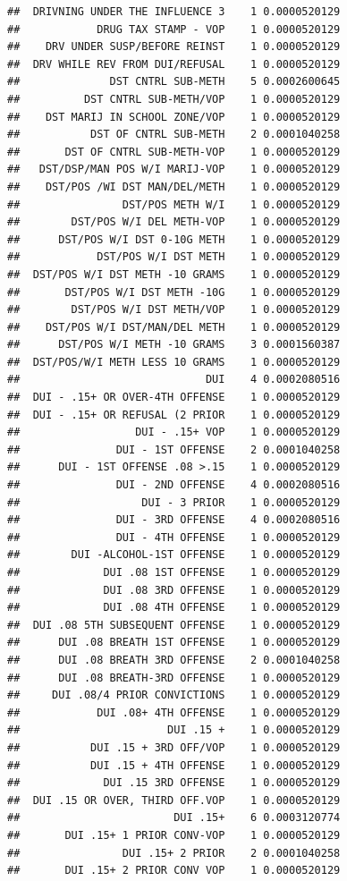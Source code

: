\documentclass[]{book}
\begin{document}
\begin{verbatim}
##  DRIVNING UNDER THE INFLUENCE 3    1 0.0000520129
##            DRUG TAX STAMP - VOP    1 0.0000520129
##    DRV UNDER SUSP/BEFORE REINST    1 0.0000520129
##  DRV WHILE REV FROM DUI/REFUSAL    1 0.0000520129
##              DST CNTRL SUB-METH    5 0.0002600645
##          DST CNTRL SUB-METH/VOP    1 0.0000520129
##    DST MARIJ IN SCHOOL ZONE/VOP    1 0.0000520129
##           DST OF CNTRL SUB-METH    2 0.0001040258
##       DST OF CNTRL SUB-METH-VOP    1 0.0000520129
##   DST/DSP/MAN POS W/I MARIJ-VOP    1 0.0000520129
##    DST/POS /WI DST MAN/DEL/METH    1 0.0000520129
##                DST/POS METH W/I    1 0.0000520129
##        DST/POS W/I DEL METH-VOP    1 0.0000520129
##      DST/POS W/I DST 0-10G METH    1 0.0000520129
##            DST/POS W/I DST METH    1 0.0000520129
##  DST/POS W/I DST METH -10 GRAMS    1 0.0000520129
##       DST/POS W/I DST METH -10G    1 0.0000520129
##        DST/POS W/I DST METH/VOP    1 0.0000520129
##    DST/POS W/I DST/MAN/DEL METH    1 0.0000520129
##      DST/POS W/I METH -10 GRAMS    3 0.0001560387
##  DST/POS/W/I METH LESS 10 GRAMS    1 0.0000520129
##                             DUI    4 0.0002080516
##  DUI - .15+ OR OVER-4TH OFFENSE    1 0.0000520129
##  DUI - .15+ OR REFUSAL (2 PRIOR    1 0.0000520129
##                  DUI - .15+ VOP    1 0.0000520129
##               DUI - 1ST OFFENSE    2 0.0001040258
##      DUI - 1ST OFFENSE .08 >.15    1 0.0000520129
##               DUI - 2ND OFFENSE    4 0.0002080516
##                   DUI - 3 PRIOR    1 0.0000520129
##               DUI - 3RD OFFENSE    4 0.0002080516
##               DUI - 4TH OFFENSE    1 0.0000520129
##        DUI -ALCOHOL-1ST OFFENSE    1 0.0000520129
##             DUI .08 1ST OFFENSE    1 0.0000520129
##             DUI .08 3RD OFFENSE    1 0.0000520129
##             DUI .08 4TH OFFENSE    1 0.0000520129
##  DUI .08 5TH SUBSEQUENT OFFENSE    1 0.0000520129
##      DUI .08 BREATH 1ST OFFENSE    1 0.0000520129
##      DUI .08 BREATH 3RD OFFENSE    2 0.0001040258
##      DUI .08 BREATH-3RD OFFENSE    1 0.0000520129
##     DUI .08/4 PRIOR CONVICTIONS    1 0.0000520129
##            DUI .08+ 4TH OFFENSE    1 0.0000520129
##                       DUI .15 +    1 0.0000520129
##           DUI .15 + 3RD OFF/VOP    1 0.0000520129
##           DUI .15 + 4TH OFFENSE    1 0.0000520129
##             DUI .15 3RD OFFENSE    1 0.0000520129
##  DUI .15 OR OVER, THIRD OFF.VOP    1 0.0000520129
##                        DUI .15+    6 0.0003120774
##       DUI .15+ 1 PRIOR CONV-VOP    1 0.0000520129
##                DUI .15+ 2 PRIOR    2 0.0001040258
##       DUI .15+ 2 PRIOR CONV VOP    1 0.0000520129

\end{verbatim}
\end{document}
